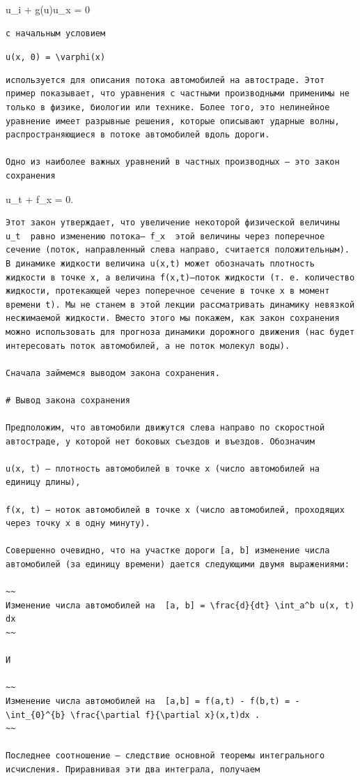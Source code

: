 \documentclass[
  ukrainian,
]{article}
\begin{document}
u\_i + g(u)u\_x = 0

\begin{verbatim}
с начальным условием
\end{verbatim}

\texttt{u(x,\ 0)\ =\ \textbackslash{}varphi(x)}

\begin{verbatim}
используется для описания потока автомобилей на автостраде. Этот пример показывает, что уравнения с частными производными применимы не только в физике, биологии или технике. Более того, это нелинейное уравнение имеет разрывные решения, которые описывают ударные волны, распространяющиеся в потоке автомобилей вдоль дороги.

Одно из наиболее важных уравнений в частных производных — это закон сохранения
\end{verbatim}

u\_t + f\_x = 0.

\begin{verbatim}
Этот закон утверждает, что увеличение некоторой физической величины  u_t  равно изменению потока— f_x  этой величины через поперечное сечение (поток, направленный слева направо, считается положительным). В динамике жидкости величина u(x,t) может обозначать плотность жидкости в точке x, а величина f(x,t)—поток жидкости (т. е. количество жидкости, протекающей через поперечное сечение в точке x в момент времени t). Мы не станем в этой лекции рассматривать динамику невязкой несжимаемой жидкости. Вместо этого мы покажем, как закон сохранения можно использовать для прогноза динамики дорожного движения (нас будет интересовать поток автомобилей, а не поток молекул воды).

Сначала займемся выводом закона сохранения.

# Вывод закона сохранения

Предположим, что автомобили движутся слева направо по скоростной автостраде, у которой нет боковых съездов и въездов. Обозначим

u(x, t) — плотность автомобилей в точке x (число автомобилей на единицу длины),

f(x, t) — ноток автомобилей в точке x (число автомобилей, проходящих через точку x в одну минуту).

Совершенно очевидно, что на участке дороги [a, b] изменение числа автомобилей (за единицу времени) дается следующими двумя выражениями:

~~
Изменение числа автомобилей на  [a, b] = \frac{d}{dt} \int_a^b u(x, t) dx
~~

И

~~
Изменение числа автомобилей на  [a,b] = f(a,t) - f(b,t) = -\int_{0}^{b} \frac{\partial f}{\partial x}(x,t)dx .
~~

Последнее соотношение — следствие основной теоремы интегрального исчисления. Приравнивая эти два интеграла, получаем
\end{verbatim}
\end{document}
